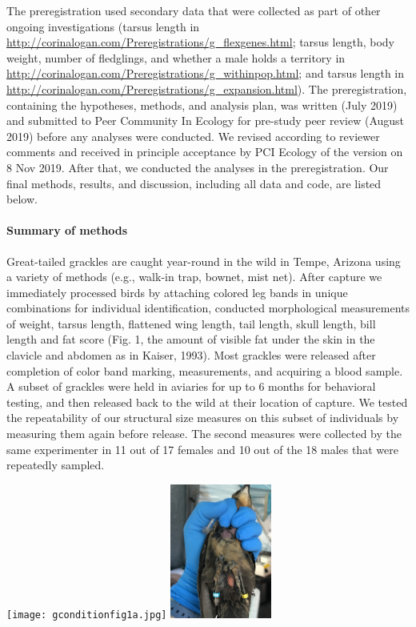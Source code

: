 \documentclass[
]{article}
\begin{document}
The preregistration used secondary data that were collected as part of
other ongoing investigations (tarsus length in
\url{http://corinalogan.com/Preregistrations/g_flexgenes.html}; tarsus
length, body weight, number of fledglings, and whether a male holds a
territory in
\url{http://corinalogan.com/Preregistrations/g_withinpop.html}; and
tarsus length in
\url{http://corinalogan.com/Preregistrations/g_expansion.html}). The
preregistration, containing the hypotheses, methods, and analysis plan,
was written (July 2019) and submitted to Peer Community In Ecology for
pre-study peer review (August 2019) before any analyses were conducted.
We revised according to reviewer comments and received in principle
acceptance by PCI Ecology of the version on 8 Nov 2019. After that, we
conducted the analyses in the preregistration. Our final methods,
results, and discussion, including all data and code, are listed below.

\hypertarget{summary-of-methods}{%
\paragraph{\texorpdfstring{\textbf{Summary of
methods}}{Summary of methods}}\label{summary-of-methods}}

Great-tailed grackles are caught year-round in the wild in Tempe,
Arizona using a variety of methods (e.g., walk-in trap, bownet, mist
net). After capture we immediately processed birds by attaching colored
leg bands in unique combinations for individual identification,
conducted morphological measurements of weight, tarsus length, flattened
wing length, tail length, skull length, bill length and fat score (Fig.
1, the amount of visible fat under the skin in the clavicle and abdomen
as in Kaiser, 1993). Most grackles were released after completion of
color band marking, measurements, and acquiring a blood sample. A subset
of grackles were held in aviaries for up to 6 months for behavioral
testing, and then released back to the wild at their location of
capture. We tested the repeatability of our structural size measures on
this subset of individuals by measuring them again before release. The
second measures were collected by the same experimenter in 11 out of 17
females and 10 out of the 18 males that were repeatedly sampled.

\texttt{[image: gconditionfig1a.jpg]}
\includegraphics[width=0.25\textwidth,height=\textheight]{gconditionfig1b.jpg}
\end{document}
